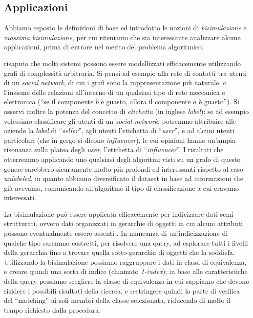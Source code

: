 \subsection{Applicazioni}
\label{sec:applications}
Abbiamo esposto le definizioni di base ed introdotto le nozioni di \emph{bisimulazione} e \emph{massima bisimulazione}, per cui riteniamo che sia interessante analizzare alcune applicazioni, prima di entrare nel merito del problema algoritmico.

\accente risaputo che molti sistemi possono essere modellizzati efficacemente utilizzando grafi di complessità arbitraria. Si pensi ad esempio alla rete di contatti tra utenti di un \emph{social network}, di cui i grafi sono la rappresentazione più naturale, o l'insieme delle relazioni all'interno di un qualsiasi tipo di rete meccanica o elettronica (``se il componente $b$ è guasto, allora il componente $a$ è guasto''). Si osservi inoltre la potenza del concetto di \emph{etichetta} (in inglese \emph{label}): se ad esempio volessimo classificare gli utenti di un \emph{social network}, potremmo attribuire alle aziende la \emph{label} di ``\emph{seller}'', agli utenti l'etichetta di ``\emph{user}'', e ad alcuni utenti particolari (che in gergo si dicono \emph{influencer}), le cui opinioni hanno un'ampia risonanza sulla platea degli \emph{user}, l'etichetta di ``\emph{influencer}''. I risultati che otterremmo applicando uno qualsiasi degli algoritmi visti su un grafo di questo genere sarebbero sicuramente molto più profondi ed interessanti rispetto al caso \emph{unlabeled}, in quanto abbiamo diversificato il dataset in base ad informazioni che già avevamo, comunicando all'algoritmo il tipo di classificazione a cui eravamo interessati.

La bisimulazione può essere applicata efficacemente per indicizzare dati semi-strutturati, ovvero dati organizzati in gerarchie di oggetti in cui alcuni attributi possono eventualmente essere assenti \cite{milo}. In mancanza di un'indicizzazione di qualche tipo saremmo costretti, per risolvere una query, ad esplorare tutti i livelli della gerarchia fino a trovare quella sotto-gerarchia di oggetti che la soddisfa. Utilizzando la bisimulazione possiamo raggruppare i dati in classi di equivalenza, e creare quindi una sorta di indice (chiamato \emph{1-index}); in base alle caratteristiche della query possiamo scegliere la classe di equivalenza in cui sappiamo che devono risidere i possibili risultati della ricerca, e restringere quindi la parte di verifica del ``matching'' ai soli membri della classe selezionata, riducendo di molto il tempo richiesto dalla procedura.

